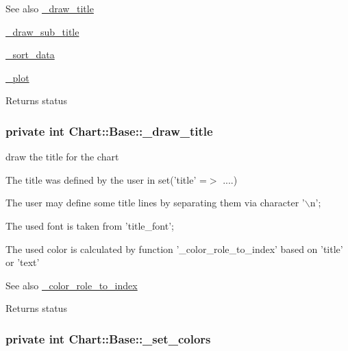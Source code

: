 \begin{DoxySeeAlso}{See also}
\hyperlink{classChart_1_1Base_aa3467472a4c4a598c5a2f64de8c438c1}{\_\-draw\_\-title} 

\hyperlink{classChart_1_1Base_afd4f3ee3925d1e765e099c80e6c98da7}{\_\-draw\_\-sub\_\-title} 

\hyperlink{classChart_1_1Base_ade88df5ecdc74e50ea683b63424ba84a}{\_\-sort\_\-data} 

\hyperlink{classChart_1_1Base_aa13b0e86a933ce6b865c098fd0bdb37d}{\_\-plot}
\end{DoxySeeAlso}
\begin{DoxyReturn}{Returns}
status 
\end{DoxyReturn}
\hypertarget{classChart_1_1Base_aa3467472a4c4a598c5a2f64de8c438c1}{
\subsubsection[{\_\-draw\_\-title}]{\setlength{\rightskip}{0pt plus 5cm}private int {\bf Chart::Base::\_\-draw\_\-title}}}
\label{classChart_1_1Base_aa3467472a4c4a598c5a2f64de8c438c1}


draw the title for the chart 

The title was defined by the user in set('title' =$>$ ....)\par
 The user may define some title lines by separating them via character '$\backslash$n';\par
 The used font is taken from 'title\_\-font';\par
 The used color is calculated by function '\_\-color\_\-role\_\-to\_\-index' based on 'title' or 'text'\par
 \begin{DoxySeeAlso}{See also}
\hyperlink{classChart_1_1Base_a43111a8e1210740ebd3a6aa9f9567c82}{\_\-color\_\-role\_\-to\_\-index} 
\end{DoxySeeAlso}
\begin{DoxyReturn}{Returns}
status 
\end{DoxyReturn}
\hypertarget{classChart_1_1Base_addecc110eb46a126acaad69e113d06ea}{
\subsubsection[{\_\-set\_\-colors}]{\setlength{\rightskip}{0pt plus 5cm}private int {\bf Chart::Base::\_\-set\_\-colors}}}
\label{classChart_1_1Base_addecc110eb46a126acaad69e113d06ea}



